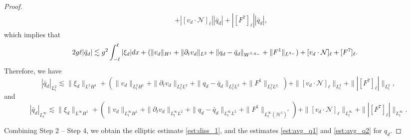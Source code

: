\documentclass[letterpaper,reqno,10pt,twoside]{amsart}
\theoremstyle{definition}
\theoremstyle{remark}
\def\p{\partial}
\begin{document}
\begin{proof}
{\[\begin{aligned}
				&+|[v_{d}\cdot \mathcal{N}]_{\ell}||\bar{q}_{d}|+|[F^{7}]_{\ell}||\bar{q}_{d}|,
			\end{aligned}\]
			\noindent which implies that
			\begin{align}{\label{equ:ODE_2}}
				2g\ell|\bar{q}_{d}|\lesssim g^{2}\int_{-\ell}^{\ell}|\xi_{d}|dx+(\|v_{d}\|_{H^{1}}+\|\p_{t}v_{d}\|_{L^{2}}+\|q_{d}-\bar{q}_{d}\|_{W^{1,q_{-}}}+\|F^{1}\|_{L^{q_-}})
				&+[v_{d}\cdot \mathcal{N}]_{\ell}+[F^{7}]_{\ell}.
			\end{align}
			Therefore, we have
			\[
			|\bar{q}_{d}|_{L_{t}^{2}}\lesssim \|\xi_{d}\|_{L^{2}H^{1}}+(\|v_{d}\|_{L_{t}^{2}H^{1}}+\|\p_{t}v_{d}\|_{L_{t}^{2}L^{2}}+\|q_{d}-\bar{q}_{d}\|_{L_{t}^{2}L^{2}}+\|F^{1}\|_{L_{t}^{2}L^{q_-}})
			+\|[v_{d}\cdot \mathcal{N}]_{\ell}\|_{L_{t}^{2}}+\||[F^{7}]_{\ell}|\|_{L_{t}^{2}},
			\]
			\noindent and
			\[
			|\bar{q}_{d}|_{L_{t}^{\infty}}\lesssim \|\xi_{d}\|_{L^{\infty}H^{1}}+(\|v_{d}\|_{L_{t}^{\infty}H^{1}}+\|\p_{t}v_{d}\|_{L_{t}^{\infty}L^{2}}+\|q_{d}-\bar{q}_{d}\|_{L_{t}^{\infty}L^{2}}+\|F^{1}\|_{L_{t}^{\infty}(\mathcal{H}^1)^{*}})+\|[v_{d}\cdot \mathcal{N}]_{\ell}\|_{L_{t}^{\infty}}+\||[F^{7}]_{\ell}|\|_{L_{t}^{\infty}}.
			\]
			
			Combining Step 2 -- Step 4, we obtain the elliptic estimate \eqref{est:diss_1}, and the estimates \eqref{est:avg_q1} and \eqref{est:avg_q2} for $q_{d}$.  
		}

\end{proof}
\end{document}
